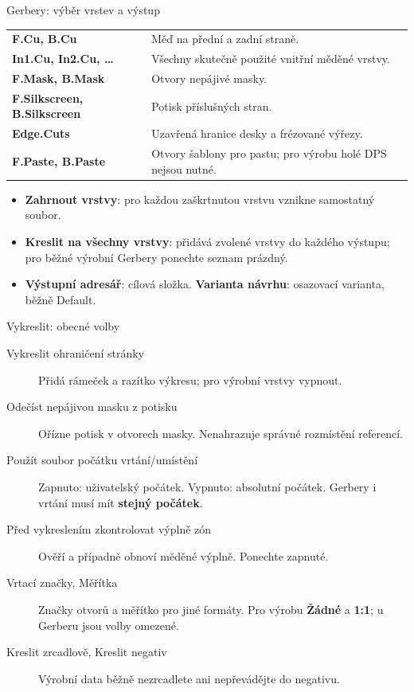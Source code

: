 \documentclass{beamer}
\begin{document}
\begin{frame}[t]{Gerbery: výběr vrstev a výstup}
	\small
	\begin{center}
		\renewcommand{\arraystretch}{1.25}
		\begin{tabular}{p{}p{}}
			\textbf{F.Cu, B.Cu} & Měď na přední a zadní straně. \\
			\textbf{In1.Cu, In2.Cu, \ldots} & Všechny skutečně použité vnitřní měděné vrstvy. \\
			\textbf{F.Mask, B.Mask} & Otvory nepájivé masky. \\
			\textbf{F.Silkscreen, B.Silkscreen} & Potisk příslušných stran. \\
			\textbf{Edge.Cuts} & Uzavřená hranice desky a frézované výřezy. \\
			\textbf{F.Paste, B.Paste} & Otvory šablony pro pastu; pro výrobu holé DPS nejsou nutné. \\
		\end{tabular}
	\end{center}
	\begin{itemize}
		\item \textbf{Zahrnout vrstvy}: pro každou zaškrtnutou vrstvu vznikne samostatný soubor.
		\item \textbf{Kreslit na všechny vrstvy}: přidává zvolené vrstvy do každého výstupu; pro běžné výrobní Gerbery ponechte seznam prázdný.
		\item \textbf{Výstupní adresář}: cílová složka. \textbf{Varianta návrhu}: osazovací varianta, běžně Default.
	\end{itemize}
\end{frame}

\begin{frame}[t]{Vykreslit: obecné volby}
	\small
	\begin{description}
		\item[Vykreslit ohraničení stránky] Přidá rámeček a razítko výkresu; pro výrobní vrstvy vypnout.
		\item[Odečíst nepájivou masku z potisku] Ořízne potisk v otvorech masky. Nenahrazuje správné rozmístění referencí.
		\item[Použít soubor počátku vrtání/umístění] Zapnuto: uživatelský počátek. Vypnuto: absolutní počátek. Gerbery i vrtání musí mít \textbf{stejný počátek}.
		\item[Před vykreslením zkontrolovat výplně zón] Ověří a případně obnoví měděné výplně. Ponechte zapnuté.
		\item[Vrtací značky, Měřítka] Značky otvorů a měřítko pro jiné formáty. Pro výrobu \textbf{Žádné} a \textbf{1:1}; u Gerberu jsou volby omezené.
		\item[Kreslit zrcadlově, Kreslit negativ] Výrobní data běžně nezrcadlete ani nepřevádějte do negativu.
	\end{description}
\end{frame}
\end{document}
